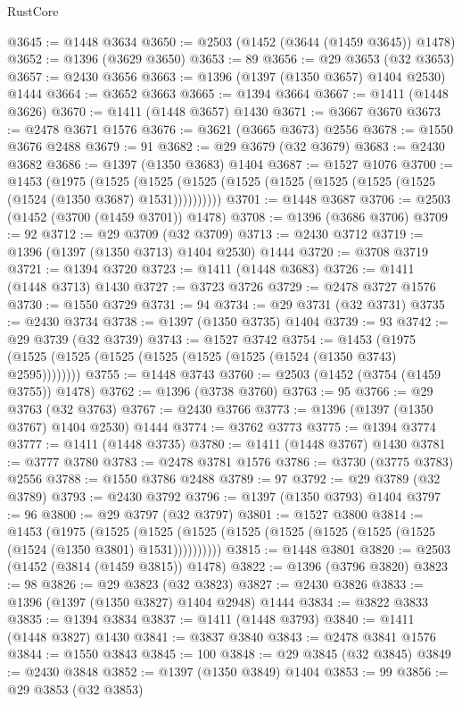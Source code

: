 \begin{lexlean}{RustCore}
\begin{coremodule}
@3645 := @1448 @3634
@3650 := @2503 (@1452 (@3644 (@1459 @3645)) @1478)
@3652 := @1396 (@3629 @3650)
@3653 := 89
@3656 := @29 @3653 (@32 @3653)
@3657 := @2430 @3656
@3663 := @1396 (@1397 (@1350 @3657) @1404 @2530) @1444
@3664 := @3652 @3663
@3665 := @1394 @3664
@3667 := @1411 (@1448 @3626)
@3670 := @1411 (@1448 @3657) @1430
@3671 := @3667 @3670
@3673 := @2478 @3671 @1576
@3676 := @3621 (@3665 @3673) @2556
@3678 := @1550 @3676 @2488
@3679 := 91
@3682 := @29 @3679 (@32 @3679)
@3683 := @2430 @3682
@3686 := @1397 (@1350 @3683) @1404
@3687 := @1527 @1076
@3700 := @1453
    (@1975
      (@1525 (@1525 (@1525 (@1525 (@1525 (@1525 (@1525 (@1525 (@1524 (@1350 @3687) @1531))))))))))
@3701 := @1448 @3687
@3706 := @2503 (@1452 (@3700 (@1459 @3701)) @1478)
@3708 := @1396 (@3686 @3706)
@3709 := 92
@3712 := @29 @3709 (@32 @3709)
@3713 := @2430 @3712
@3719 := @1396 (@1397 (@1350 @3713) @1404 @2530) @1444
@3720 := @3708 @3719
@3721 := @1394 @3720
@3723 := @1411 (@1448 @3683)
@3726 := @1411 (@1448 @3713) @1430
@3727 := @3723 @3726
@3729 := @2478 @3727 @1576
@3730 := @1550 @3729
@3731 := 94
@3734 := @29 @3731 (@32 @3731)
@3735 := @2430 @3734
@3738 := @1397 (@1350 @3735) @1404
@3739 := 93
@3742 := @29 @3739 (@32 @3739)
@3743 := @1527 @3742
@3754 := @1453 (@1975 (@1525 (@1525 (@1525 (@1525 (@1525 (@1525 (@1524 (@1350 @3743) @2595))))))))
@3755 := @1448 @3743
@3760 := @2503 (@1452 (@3754 (@1459 @3755)) @1478)
@3762 := @1396 (@3738 @3760)
@3763 := 95
@3766 := @29 @3763 (@32 @3763)
@3767 := @2430 @3766
@3773 := @1396 (@1397 (@1350 @3767) @1404 @2530) @1444
@3774 := @3762 @3773
@3775 := @1394 @3774
@3777 := @1411 (@1448 @3735)
@3780 := @1411 (@1448 @3767) @1430
@3781 := @3777 @3780
@3783 := @2478 @3781 @1576
@3786 := @3730 (@3775 @3783) @2556
@3788 := @1550 @3786 @2488
@3789 := 97
@3792 := @29 @3789 (@32 @3789)
@3793 := @2430 @3792
@3796 := @1397 (@1350 @3793) @1404
@3797 := 96
@3800 := @29 @3797 (@32 @3797)
@3801 := @1527 @3800
@3814 := @1453
    (@1975
      (@1525 (@1525 (@1525 (@1525 (@1525 (@1525 (@1525 (@1525 (@1524 (@1350 @3801) @1531))))))))))
@3815 := @1448 @3801
@3820 := @2503 (@1452 (@3814 (@1459 @3815)) @1478)
@3822 := @1396 (@3796 @3820)
@3823 := 98
@3826 := @29 @3823 (@32 @3823)
@3827 := @2430 @3826
@3833 := @1396 (@1397 (@1350 @3827) @1404 @2948) @1444
@3834 := @3822 @3833
@3835 := @1394 @3834
@3837 := @1411 (@1448 @3793)
@3840 := @1411 (@1448 @3827) @1430
@3841 := @3837 @3840
@3843 := @2478 @3841 @1576
@3844 := @1550 @3843
@3845 := 100
@3848 := @29 @3845 (@32 @3845)
@3849 := @2430 @3848
@3852 := @1397 (@1350 @3849) @1404
@3853 := 99
@3856 := @29 @3853 (@32 @3853)

\end{coremodule}
\end{lexlean}
